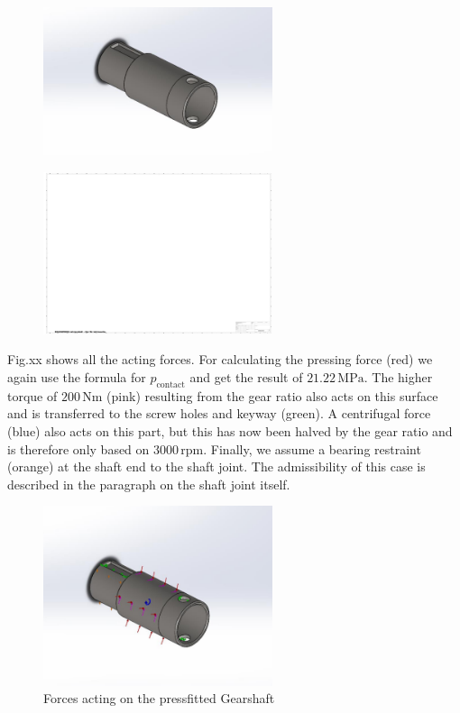 \begin{figure}[H]
\centering
\includegraphics[width=0.6\textwidth]{texfiles/mech/eimg/propulsion/picture_gearshaft_right}
\caption{}
\label{}
\end{figure}

\begin{figure}[H]
\centering
\includegraphics[width=0.6\textwidth]{texfiles/mech/eimg/propulsion/spaceholder_technical_drawing}
\caption{}
\label{}
\end{figure}

Fig.xx  shows all the acting forces. For calculating the pressing force (red) we again use the formula for \(p_{\text{contact}}\)
and get the result of \(21.22 \, \text{MPa}\). The higher torque of \(200 \, \text{Nm}\) (pink) resulting from the gear ratio also acts on this surface and is transferred to the screw holes and keyway (green). A centrifugal force (blue) also acts on this part, but this has now been halved by the gear ratio and is therefore only based on \(3000 \, \text{rpm}\). Finally, we assume a bearing restraint (orange) at the shaft end to the shaft joint. The admissibility of this case is described in the paragraph on the shaft joint itself.

\begin{figure}[H]
\centering
\includegraphics[width=0.6\textwidth]{texfiles/mech/eimg/propulsion/picture_forces_gearshaft_right}
\caption{Forces acting on the pressfitted Gearshaft}
\label{fig:gearshaft_right_forces}
\end{figure}


